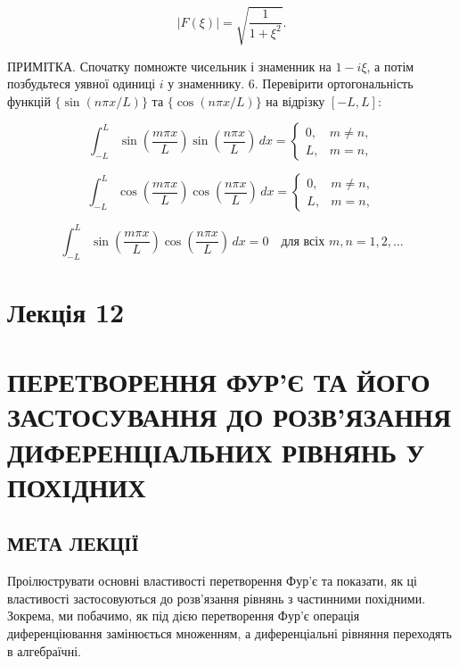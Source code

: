 \documentclass[
  ukrainian,
]{article}
\begin{document}
\[
\left|F(\xi)\right| = \sqrt{\frac{1}{1+\xi^2}}.
\]

ПРИМІТКА. Спочатку помножте чисельник і знаменник на \(1-i\xi\), а потім
позбудьтеся уявної одиниці \(i\) у знаменнику. 6. Перевірити
ортогональність функцій \(\{\sin(n\pi x/L)\}\) та \(\{\cos(n\pi x/L)\}\)
на відрізку \([-L,L]\):

\[
\int_{-L}^{L} \sin\!\left(\frac{m\pi x}{L}\right)\sin\!\left(\frac{n\pi x}{L}\right)\,dx =
\begin{cases}
0, & m \neq n,\\
L, & m = n,
\end{cases}
\]

\[
\int_{-L}^{L} \cos\!\left(\frac{m\pi x}{L}\right)\cos\!\left(\frac{n\pi x}{L}\right)\,dx =
\begin{cases}
0, & m \neq n,\\
L, & m = n,
\end{cases}
\]

\[
\int_{-L}^{L} \sin\!\left(\frac{m\pi x}{L}\right)\cos\!\left(\frac{n\pi x}{L}\right)\,dx = 0
\quad \text{для всіх } m,n=1,2,\dots
\]

\section{Лекція 12}\label{ux43bux435ux43aux446ux456ux44f-12}

\section{ПЕРЕТВОРЕННЯ ФУР'Є ТА ЙОГО ЗАСТОСУВАННЯ ДО РОЗВ'ЯЗАННЯ
ДИФЕРЕНЦІАЛЬНИХ РІВНЯНЬ У
ПОХІДНИХ}\label{ux43fux435ux440ux435ux442ux432ux43eux440ux435ux43dux43dux44f-ux444ux443ux440ux454-ux442ux430-ux439ux43eux433ux43e-ux437ux430ux441ux442ux43eux441ux443ux432ux430ux43dux43dux44f-ux434ux43e-ux440ux43eux437ux432ux44fux437ux430ux43dux43dux44f-ux434ux438ux444ux435ux440ux435ux43dux446ux456ux430ux43bux44cux43dux438ux445-ux440ux456ux432ux43dux44fux43dux44c-ux443-ux43fux43eux445ux456ux434ux43dux438ux445}

\subsection{МЕТА
ЛЕКЦІЇ}\label{ux43cux435ux442ux430-ux43bux435ux43aux446ux456ux457}

Проілюструвати основні властивості перетворення Фур'є та показати, як ці
властивості застосовуються до розв'язання рівнянь з частинними
похідними. Зокрема, ми побачимо, як під дією перетворення Фур'є операція
диференціювання замінюється множенням, а диференціальні рівняння
переходять в алгебраїчні.
\end{document}
